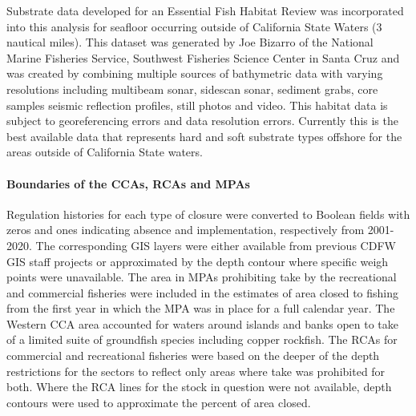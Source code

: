 \documentclass[11pt,
  english,
  letterpaper,
]{article}
\begin{document}
Substrate data developed for an Essential Fish Habitat Review was incorporated into this analysis for seafloor occurring outside of California State Waters (3 nautical miles). This dataset was generated by Joe Bizarro of the National Marine Fisheries Service, Southwest Fisheries Science Center in Santa Cruz and was created by combining multiple sources of bathymetric data with varying resolutions including multibeam sonar, sidescan sonar, sediment grabs, core samples seismic reflection profiles, still photos and video. This habitat data is subject to georeferencing errors and data resolution errors. Currently this is the best available data that represents hard and soft substrate types offshore for the areas outside of California State waters.

\leavevmode\tagmcend\tagstructend\par


\hypertarget{boundaries-of-the-ccas-rcas-and-mpas}{%
\paragraph{Boundaries of the CCAs, RCAs and MPAs}\label{boundaries-of-the-ccas-rcas-and-mpas}}

\leavevmode\tagmcend\tagstructend


Regulation histories for each type of closure were converted to Boolean fields with zeros and ones indicating absence and implementation, respectively from 2001-2020. The corresponding GIS layers were either available from previous CDFW GIS staff projects or approximated by the depth contour where specific weigh points were unavailable. The area in MPAs prohibiting take by the recreational and commercial fisheries were included in the estimates of area closed to fishing from the first year in which the MPA was in place for a full calendar year. The Western CCA area accounted for waters around islands and banks open to take of a limited suite of groundfish species including copper rockfish. The RCAs for commercial and recreational fisheries were based on the deeper of the depth restrictions for the sectors to reflect only areas where take was prohibited for both. Where the RCA lines for the stock in question were not available, depth contours were used to approximate the percent of area closed.

\leavevmode\tagmcend\tagstructend\par
\end{document}
